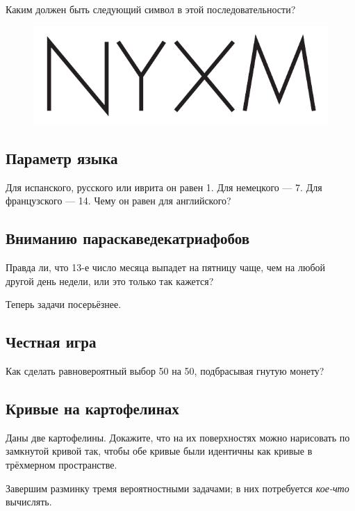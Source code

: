 Каким должен быть следующий символ в этой последовательности?

\begin{figure}[h!]
\centering
\includegraphics[scale=0.5]{pics/ZYXW}
\end{figure}

\subsection*{Параметр языка}

Для испанского, русского или иврита он равен 1.
Для немецкого --- 7.
Для французского --- 14.
Чему он равен для английского?

\subsection*{Вниманию параскаведекатриафобов}

Правда ли, что 13-е число месяца выпадет на пятницу чаще,
чем на любой другой день недели,
или это только так кажется?

\medskip

Теперь задачи посерьёзнее.

\subsection*{Честная игра}

Как сделать равновероятный выбор 50 на 50, подбрасывая гнутую монету?

\subsection*{Кривые на картофелинах}

Даны две картофелины.
Докажите, что на их поверхностях можно нарисовать по замкнутой кривой так, чтобы обе кривые были идентичны как кривые в трёхмерном пространстве.

\medskip

Завершим разминку тремя вероятностными задачами; в них потребуется \emph{кое-что} вычислять.

